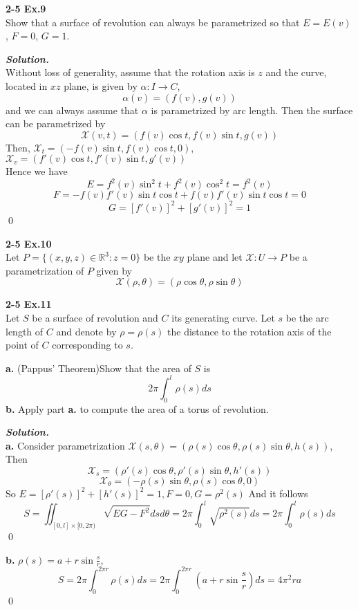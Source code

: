 \documentclass{article}
\begin{document}
\par
\textbf{2-5 Ex.9}\\
Show that a surface of revolution can always be parametrized
so that $E=E(v)$, $F=0$, $G=1$.

\par
\textbf{\textit{Solution.}}\\
Without loss of generality, assume that the rotation axis is
$z$ and the curve, located in $xz$ plane, is given by 
$\alpha: I \to C$,
$$
    \alpha(v) = (f(v), g(v))
$$
and we can always assume that $\alpha$ is parametrized by 
arc length.
Then the surface can be parametrized by
$$
    \mathcal{X}(v,t) = (f(v)\cos t, f(v) \sin t, g(v))
$$
Then, $\mathcal{X}_t = (-f(v)\sin t, f(v) \cos t, 0)$,
$\mathcal{X}_v = (f'(v)\cos t, f'(v) \sin t, g'(v))$\\
Hence we have
$$
    E=f^2(v)\sin^2t+f^2(v)\cos^2t=f^2(v)
$$
$$
    F = -f(v)f'(v)\sin t \cos t + f(v)f'(v) \sin t \cos t = 0
$$
$$
    G=[f'(v)]^2+[g'(v)]^2=1
$$
\qed

\par
\textbf{2-5 Ex.10}\\
Let $P = \{(x,y,z) \in \mathbb{R}^3:z=0\}$ be the $xy$ plane
and let $\mathcal{X}: U \to P$ be a parametrization of $P$
given by
$$
    \mathcal{X}(\rho, \theta) = (\rho \cos \theta, \rho \sin \theta)
$$

\par
\textbf{2-5 Ex.11}\\
Let $S$ be a surface of revolution and $C$ its generating
curve. Let $s$ be the arc length of $C$ and denote by
$\rho=\rho(s)$ the distance to the rotation axis of the point
of $C$ corresponding to $s$.

\par
\textbf{a. }(Pappus' Theorem)Show that the area of $S$ is
$$
    2 \pi \int_0^l \rho(s)ds
$$
\textbf{b. }Apply part \textbf{a.} to compute the area of a
torus of revolution.

\par
\textbf{\textit{Solution.}}\\
\textbf{a. }Consider parametrization 
$\mathcal{X}(s, \theta)=(\rho(s) \cos \theta, \rho(s) \sin \theta, h(s))$,\\
Then
$$
    \mathcal{X}_s = (\rho'(s)\cos \theta, \rho'(s) \sin \theta, h'(s))
$$
$$
    \mathcal{X}_\theta = (-\rho(s)\sin \theta, \rho(s) \cos \theta, 0)
$$
So $E=[\rho'(s)]^2 + [h'(s)]^2 = 1, F = 0, G = \rho^2(s)$
And it follows
$$
    S = \iint_{[0,l] \times [0, 2 \pi)}\sqrt{EG-F^2}dsd\theta
    = 2 \pi \int_0^l \sqrt{\rho^2(s)}ds = 2 \pi \int_0^l \rho(s)ds
$$
\qed
\par
\textbf{b. }$\rho(s) = a + r \sin \frac{s}{r}$,
$$
    S = 2 \pi \int_0^{2\pi r}\rho(s)ds = 2 \pi \int_0^{2\pi r}(a+r \sin \frac{s}{r})ds = 4 \pi^2 ra
$$
\qed
\end{document}
